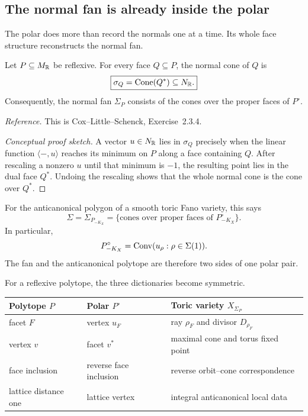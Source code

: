 \subsection{The normal fan is already inside the polar}

The polar does more than record the normals one at a time. Its whole
face structure reconstructs the normal fan.

\begin{theorem}
\label{thm:normal-fan-cones-over-polar}
Let \(P\subseteq M_{\mathbb{R}}\) be reflexive. For every face \(Q\subseteq P\),
the normal cone of \(Q\) is
\[
\boxed{
\sigma_Q=\operatorname{Cone}(Q^*)\subseteq N_{\mathbb{R}}.
}
\]
Consequently, the normal fan \(\Sigma_P\) consists of the cones over
the proper faces of \(P^\circ\).
\end{theorem}

\noindent
\textit{Reference.}
This is Cox--Little--Schenck, Exercise~2.3.4.

\begin{proof}[Conceptual proof sketch]
A vector \(u\in N_{\mathbb{R}}\) lies in \(\sigma_Q\) precisely when the
linear function \(\langle -,u\rangle\) reaches its minimum on \(P\)
along a face containing \(Q\). After rescaling a nonzero \(u\) until
that minimum is \(-1\), the resulting point lies in the dual face
\(Q^*\). Undoing the rescaling shows that the whole normal cone is the
cone over \(Q^*\).
\end{proof}

For the anticanonical polygon of a smooth toric Fano variety, this says
\[
\Sigma
=
\Sigma_{P_{-K_X}}
=
\{\text{cones over proper faces of }P_{-K_X}^\circ\}.
\]
In particular,
\[
P_{-K_X}^\circ
=
\operatorname{Conv}(u_\rho:\rho\in\Sigma(1)).
\]
The fan and the anticanonical polytope are therefore two sides of one
polar pair.

\begin{threedictionaries}
For a reflexive polytope, the three dictionaries become symmetric.

\medskip

\begin{center}
\small
\begin{tabularx}{\linewidth}{@{}
  >{\raggedright\arraybackslash}X
  >{\raggedright\arraybackslash}X
  >{\raggedright\arraybackslash}X@{}}
\toprule
\textbf{Polytope \(P\)}
&
\textbf{Polar \(P^\circ\)}
&
\textbf{Toric variety \(X_{\Sigma_P}\)}
\\
\midrule
facet \(F\)
&
vertex \(u_F\)
&
ray \(\rho_F\) and divisor \(D_{\rho_F}\)
\\
vertex \(v\)
&
facet \(v^*\)
&
maximal cone and torus fixed point
\\
face inclusion
&
reverse face inclusion
&
reverse orbit--cone correspondence
\\
lattice distance one
&
lattice vertex
&
integral anticanonical local data
\\
\bottomrule
\end{tabularx}
\end{center}
\end{threedictionaries}

